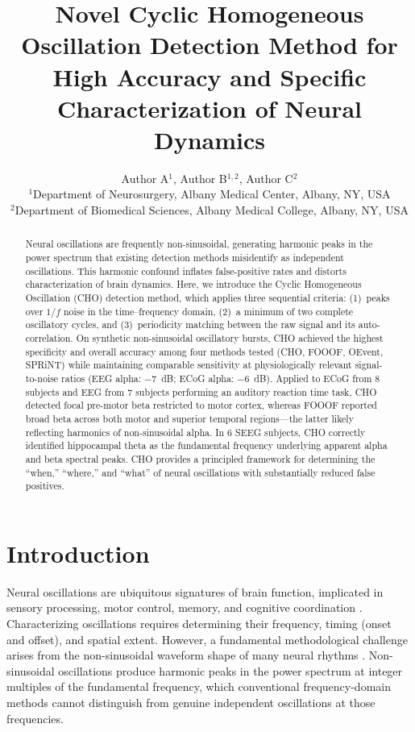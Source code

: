 \documentclass[11pt]{article}
\title{Novel Cyclic Homogeneous Oscillation Detection Method for High Accuracy and Specific Characterization of Neural Dynamics}
\author{Author A$^{1}$, Author B$^{1,2}$, Author C$^{2}$\\
\small $^{1}$Department of Neurosurgery, Albany Medical Center, Albany, NY, USA\\
\small $^{2}$Department of Biomedical Sciences, Albany Medical College, Albany, NY, USA}
\date{}
\begin{document}
\maketitle

\begin{abstract}
Neural oscillations are frequently non-sinusoidal, generating harmonic peaks in the power spectrum that existing detection methods misidentify as independent oscillations. This harmonic confound inflates false-positive rates and distorts characterization of brain dynamics. Here, we introduce the Cyclic Homogeneous Oscillation (CHO) detection method, which applies three sequential criteria: (1)~peaks over $1/f$ noise in the time--frequency domain, (2)~a minimum of two complete oscillatory cycles, and (3)~periodicity matching between the raw signal and its auto-correlation. On synthetic non-sinusoidal oscillatory bursts, CHO achieved the highest specificity and overall accuracy among four methods tested (CHO, FOOOF, OEvent, SPRiNT) while maintaining comparable sensitivity at physiologically relevant signal-to-noise ratios (EEG alpha: $-7$~dB; ECoG alpha: $-6$~dB). Applied to ECoG from 8 subjects and EEG from 7 subjects performing an auditory reaction time task, CHO detected focal pre-motor beta restricted to motor cortex, whereas FOOOF reported broad beta across both motor and superior temporal regions---the latter likely reflecting harmonics of non-sinusoidal alpha. In 6 SEEG subjects, CHO correctly identified hippocampal theta as the fundamental frequency underlying apparent alpha and beta spectral peaks. CHO provides a principled framework for determining the ``when,'' ``where,'' and ``what'' of neural oscillations with substantially reduced false positives.
\end{abstract}

\section{Introduction}

Neural oscillations are ubiquitous signatures of brain function, implicated in sensory processing, motor control, memory, and cognitive coordination \citep{buzsaki2004neuronal, fries2015rhythms, engel2001dynamic}. Characterizing oscillations requires determining their frequency, timing (onset and offset), and spatial extent. However, a fundamental methodological challenge arises from the non-sinusoidal waveform shape of many neural rhythms \citep{cole2017nonsinusoidal, jones2009quantitative}. Non-sinusoidal oscillations produce harmonic peaks in the power spectrum at integer multiples of the fundamental frequency, which conventional frequency-domain methods cannot distinguish from genuine independent oscillations at those frequencies.
\end{document}
